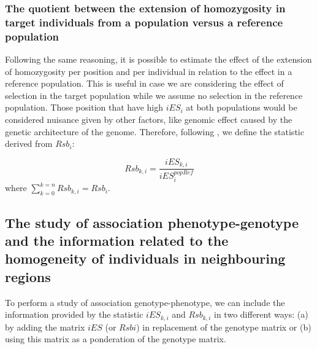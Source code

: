 \documentclass[a4paper,11pt]{article}
\begin{document}
\subsubsection{The quotient between the extension of homozygosity in target individuals from a population versus a reference population}
Following the same reasoning, it is possible to estimate the effect of the extension of homozygosity per position and per individual in relation to the effect in a reference population. This is useful in case we are considering the effect of selection in the target population while we assume no selection in the reference population. Those position that have high $iES_i$ at both populations would be considered nuisance given by other factors, like genomic effect caused by the genetic architecture of the genome. Therefore, following \citet{Tang:2007by}, we define the statistic derived from $Rsb_i$:

\begin{equation}
Rsb_{k,i} = \frac{iES_{k,i}}{iES_{i}^{popRef}}
\end{equation}
where $\sum_{k=0}^{k=n}Rsb_{k,i} = Rsb_i.$

\subsection{The study of association phenotype-genotype and the information related to the homogeneity of individuals in neighbouring regions}
To perform a study of association genotype-phenotype, we can include the information provided by the statistic $iES_{k,i}$ and $Rsb_{k,i}$ in two different ways: (a) by adding the matrix $iES$ (or $Rsbi$) in replacement of the genotype matrix or (b) using this matrix as a ponderation of the genotype matrix. %

\end{document}
